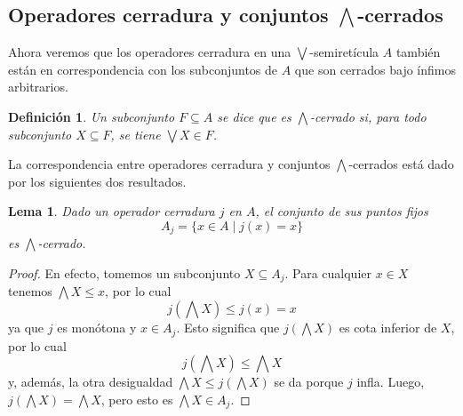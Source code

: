 \documentclass[12pt,letterpaper,titlepage]{article}
\newtheorem*{defn}{Definición}
\newtheorem*{lemma}{Lema}
\theoremstyle{definition}
\newcommand\Sup{\bigvee}
\newcommand\Inf{\bigwedge}
\newcommand\tps[1]{\texorpdfstring{#1}{}}
\newcommand\<{\langle}
\renewcommand\>{\rangle}
\begin{document}
\subsection{Operadores cerradura y conjuntos \tps{$\Inf$}-cerrados}

Ahora veremos que los operadores cerradura en una $\Sup$-semiretícula $A$
también están en correspondencia con los subconjuntos de $A$ que son cerrados
bajo ínfimos arbitrarios.

\begin{defn}
    Un subconjunto $F\subseteq A$ se dice que es $\Inf$-cerrado si,
    para todo subconjunto $X\subseteq F$, se tiene $\Sup X\in F$.
\end{defn}

La correspondencia entre operadores cerradura y conjuntos $\Inf$-cerrados
está dado por los siguientes dos resultados.

\begin{lemma}
Dado un operador cerradura $j$ en $A$, el conjunto de sus puntos fijos
\[
    A_j = \{x\in A \mid j(x) = x\}
\]
es $\Inf$-cerrado.
\end{lemma}
\begin{proof}
En efecto, tomemos un subconjunto $X\subseteq A_j$.
Para cualquier $x\in X$ tenemos $\Inf X\leq x$, por lo cual
\[
    j(\Inf X) \leq j(x) = x
\]
ya que $j$ es monótona y $x\in A_j$.
Esto significa que $j(\Inf X)$ es cota inferior de $X$, por lo cual
\[
    j(\Inf X)\leq \Inf X
\]
y, además, la otra desigualdad $\Inf X\leq j(\Inf X)$ se da porque $j$ infla.
Luego, $j(\Inf X) = \Inf X$, pero esto es $\Inf X \in A_j$.
\end{proof}
\end{document}
